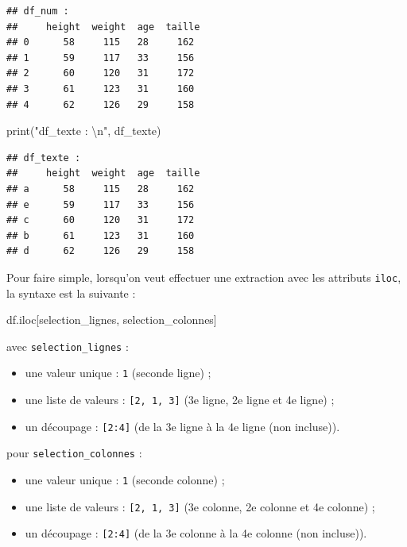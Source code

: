 \documentclass[12pt,]{book}
\newenvironment{Shaded}{\begin{snugshade}}{\end{snugshade}}
\newcommand{\CharTok}[1]{\textcolor[rgb]{0.31,0.60,0.02}{#1}}
\newcommand{\StringTok}[1]{\textcolor[rgb]{0.31,0.60,0.02}{#1}}
\newcommand{\BuiltInTok}[1]{#1}
\newcommand{\NormalTok}[1]{#1}
\providecommand{\tightlist}{%
  \setlength{\itemsep}{0pt}\setlength{\parskip}{0pt}}
\numberwithin{equation}{section}
\numberwithin{countremarque}{section}
\begin{document}
\begin{lstlisting}
## df_num : 
##     height  weight  age  taille
## 0      58     115   28     162
## 1      59     117   33     156
## 2      60     120   31     172
## 3      61     123   31     160
## 4      62     126   29     158
\end{lstlisting}

\begin{Shaded}
\begin{Highlighting}[]
\BuiltInTok{print}\NormalTok{(}\StringTok{"df_texte : }\CharTok{\textbackslash{}n}\StringTok{"}\NormalTok{, df_texte)}
\end{Highlighting}
\end{Shaded}

\begin{lstlisting}
## df_texte : 
##     height  weight  age  taille
## a      58     115   28     162
## e      59     117   33     156
## c      60     120   31     172
## b      61     123   31     160
## d      62     126   29     158
\end{lstlisting}

Pour faire simple, lorsqu'on veut effectuer une extraction avec les
attributs \texttt{iloc}, la syntaxe est la suivante :

\begin{Shaded}
\begin{Highlighting}[]
\NormalTok{df.iloc[selection_lignes, selection_colonnes]}
\end{Highlighting}
\end{Shaded}

avec \texttt{selection\_lignes} :

\begin{itemize}
\tightlist
\item
  une valeur unique : \texttt{1} (seconde ligne) ;
\item
  une liste de valeurs : \texttt{{[}2,\ 1,\ 3{]}} (3e ligne, 2e ligne et
  4e ligne) ;
\item
  un découpage : \texttt{{[}2:4{]}} (de la 3e ligne à la 4e ligne (non
  incluse)).
\end{itemize}

pour \texttt{selection\_colonnes} :

\begin{itemize}
\tightlist
\item
  une valeur unique : \texttt{1} (seconde colonne) ;
\item
  une liste de valeurs : \texttt{{[}2,\ 1,\ 3{]}} (3e colonne, 2e
  colonne et 4e colonne) ;
\item
  un découpage : \texttt{{[}2:4{]}} (de la 3e colonne à la 4e colonne
  (non incluse)).
\end{itemize}
\end{document}
